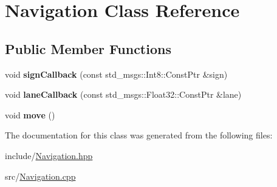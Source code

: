\hypertarget{class_navigation}{}\section{Navigation Class Reference}
\label{class_navigation}
\subsection*{Public Member Functions}
\begin{DoxyCompactItemize}
\item 
\mbox{\label{class_navigation_a91040b79d8c52ad775bb719180249656}} 
void {\bfseries sign\+Callback} (const std\+\_\+msgs\+::\+Int8\+::\+Const\+Ptr \&sign)
\item 
\mbox{\label{class_navigation_aedc84c233a36ad4df084181f528fee97}} 
void {\bfseries lane\+Callback} (const std\+\_\+msgs\+::\+Float32\+::\+Const\+Ptr \&lane)
\item 
\mbox{\label{class_navigation_a9328ca0f132d8e87480e592a82687604}} 
void {\bfseries move} ()
\end{DoxyCompactItemize}


The documentation for this class was generated from the following files\+:\begin{DoxyCompactItemize}
\item 
include/\mbox{\hyperlink{_navigation_8hpp}{Navigation.\+hpp}}\item 
src/\mbox{\hyperlink{_navigation_8cpp}{Navigation.\+cpp}}\end{DoxyCompactItemize}
